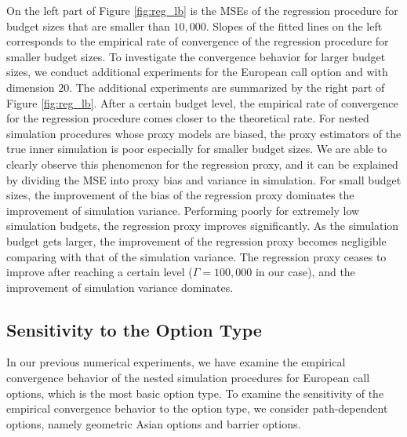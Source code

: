 \documentclass{article}
\begin{document}
On the left part of Figure \ref{fig:reg_lb} is the MSEs of the regression procedure for budget sizes that are smaller than $10,000$. 
Slopes of the fitted lines on the left corresponds to the empirical rate of convergence of the regression procedure for smaller budget sizes.
To investigate the convergence behavior for larger budget sizes, we conduct additional experiments for the European call option and with dimension $20$. 
The additional experiments are summarized by the right part of Figure \ref{fig:reg_lb}.
After a certain budget level, the empirical rate of convergence for the regression procedure comes closer to the theoretical rate. 
For nested simulation procedures whose proxy models are biased, the proxy estimators of the true inner simulation is poor especially for smaller budget sizes. 
We are able to clearly observe this phenomenon for the regression proxy, and it can be explained by dividing the MSE into proxy bias and variance in simulation.
For small budget sizes, the improvement of the bias of the regression proxy dominates the improvement of simulation variance. 
Performing poorly for extremely low simulation budgets, the regression proxy improves significantly. 
As the simulation budget gets larger, the improvement of the regression proxy becomes negligible comparing with that of the simulation variance. 
The regression proxy ceases to improve after reaching a certain level ($\Gamma = 100\!,\!000$ in our case), and the improvement of simulation variance dominates.

\subsection{Sensitivity to the Option Type} \label{sec:sensitivity-option-type}

In our previous numerical experiments, we have examine the empirical convergence behavior of the nested simulation procedures for European call options, which is the most basic option type.
To examine the sensitivity of the empirical convergence behavior to the option type, we consider path-dependent options, namely geometric Asian options and barrier options.
\end{document}
